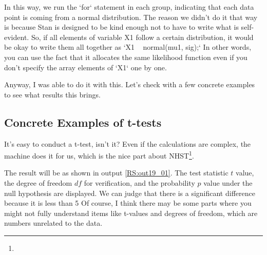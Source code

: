 \documentclass{ltjsbook}
\begin{document}
In this way, we run the `for` statement in each group, indicating that each data point is coming from a normal distribution. The reason we didn't do it that way is because Stan is designed to be kind enough not to have to write what is self-evident. So, if all elements of variable X1 follow a certain distribution, it would be okay to write them all together as `X1 ~ normal(mu1, sig);` In other words, you can use the fact that it allocates the same likelihood function even if you don't specify the array elements of `X1` one by one.

Anyway, I was able to do it with this. Let's check with a few concrete examples to see what results this brings.
\subsection{Concrete Examples of t-tests}


It's easy to conduct a t-test, isn't it? Even if the calculations are complex, the machine does it for us, which is the nice part about NHST\footnote{}.


The result will be as shown in output \ref{RS:out19_01}. The test statistic $t$ value, the degree of freedom $df$ for verification, and the probability $p$ value under the null hypothesis are displayed. We can judge that there is a significant difference because it is less than 5%
Of course, I think there may be some parts where you might not fully understand items like t-values and degrees of freedom, which are numbers unrelated to the data.

\end{document}
